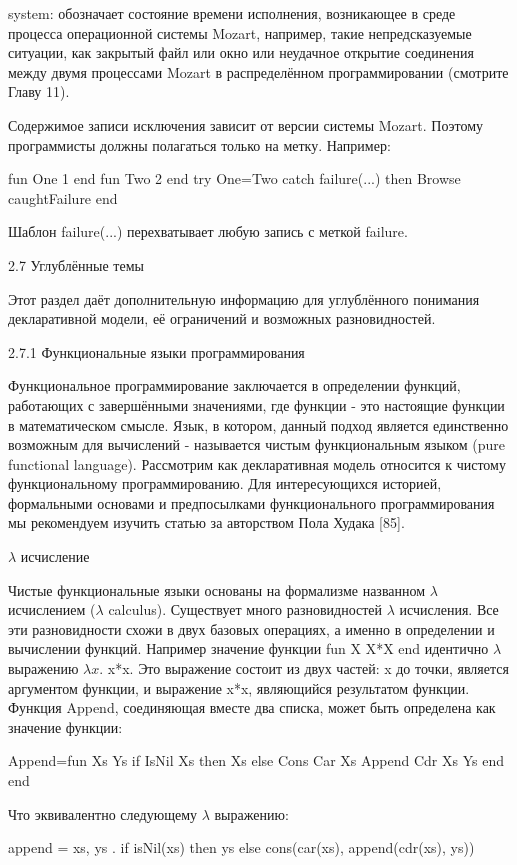 system: обозначает состояние времени исполнения, возникающее в среде процесса операционной системы Mozart, например, такие непредсказуемые ситуации, как закрытый файл или окно или неудачное открытие соединения между двумя процессами Mozart в распределённом программировании (смотрите Главу 11).

Содержимое записи исключения зависит от версии системы Mozart. Поэтому программисты должны полагаться только на метку. Например:

fun {One} 1 end
fun {Two} 2 end
try {One}={Two}
catch
failure(...) then {Browse caughtFailure}
end

Шаблон failure(...) перехватывает любую запись с меткой failure.

2.7 Углублённые темы

Этот раздел даёт дополнительную информацию для углублённого понимания декларативной модели, её ограничений и возможных разновидностей.

2.7.1 Функциональные языки программирования

Функциональное программирование заключается в определении функций, работающих с завершёнными значениями, где функции - это настоящие функции в математическом смысле. Язык, в котором, данный подход является единственно возможным для вычислений - называется чистым функциональным языком (pure functional language). Рассмотрим как декларативная модель относится к чистому функциональному программированию. Для интересующихся историей, формальными основами и предпосылками функционального программирования мы рекомендуем изучить статью за авторством Пола Худака [85].

$\lambda$ исчисление

Чистые функциональные языки основаны на формализме названном $\lambda$ исчислением ($\lambda$ calculus). Существует много разновидностей $\lambda$ исчисления. Все эти разновидности схожи в двух базовых операциях, а именно в определении и вычислении функций. Например значение функции fun { X} X*X end идентично $\lambda$ выражению $\lambda x$. x*x. Это выражение состоит из двух частей: x до точки, является аргументом функции, и выражение x*x, являющийся результатом функции. Функция Append, соединяющая вместе два списка, может быть определена как значение функции:

Append=fun { Xs Ys}
if {IsNil Xs} then Xs
else {Cons {Car Xs} {Append {Cdr Xs} Ys}}
end
end

Что эквивалентно следующему $\lambda$ выражению:

append = xs, ys . if isNil(xs) then ys
else cons(car(xs), append(cdr(xs), ys))

